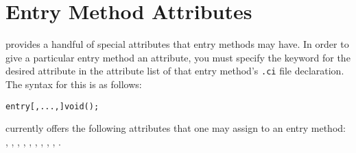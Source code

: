 \section{Entry Method Attributes}

\label{attributes}

\charmpp{}  provides a handful of special attributes that entry methods may have.  In order to give a particular entry method an attribute, you must specify the keyword for the desired
attribute in the attribute list of that entry method's {\tt .ci} file
declaration.  The syntax for this is as follows:

\begin{alltt}
entry [, ..., ] void ();
\end{alltt}

\charmpp{} currently offers the following attributes that one may assign to 
an entry method:
, , , , , , , , , .

